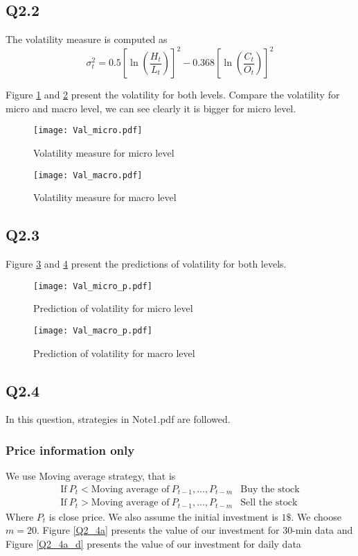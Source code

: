\documentclass[11pt]{article}
\begin{document}
\subsection{Q2.2}
The volatility measure is computed as
\[
\sigma^2_t=0.5[\ln(\frac{H_t}{L_t})]^2-0.368[\ln(\frac{C_t}{O_t})]^2
\]

Figure \ref{Val_micro} and \ref{Val_macro} present the volatility for both levels. Compare the volatility for micro and macro level, we can see clearly it is bigger for micro level.

\begin{figure}
\texttt{[image: Val\_micro.pdf]}
\caption{Volatility measure for micro level}\label{Val_micro}
\end{figure}
\begin{figure}
\texttt{[image: Val\_macro.pdf]}
\caption{Volatility measure for macro level}\label{Val_macro}
\end{figure}
\subsection{Q2.3}
Figure \ref{Val_micro_p} and \ref{Val_macro_p} present the predictions of volatility for both levels.
\begin{figure}
\texttt{[image: Val\_micro\_p.pdf]}
\caption{Prediction of volatility for micro level}\label{Val_micro_p}
\end{figure}
\begin{figure}
\texttt{[image: Val\_macro\_p.pdf]}
\caption{Prediction of volatility for macro level}\label{Val_macro_p}
\end{figure}
\subsection{Q2.4}
In this question, strategies in Note1.pdf are followed.
\subsubsection{Price information only}
We use Moving average strategy, that is
\begin{eqnarray*}
\text{If}~P_t<\text{Moving average of}~P_{t-1},\ldots,P_{t-m}&\text{Buy the stock}\\
\text{If}~P_t>\text{Moving average of}~P_{t-1},\ldots,P_{t-m}&\text{Sell the stock}
\end{eqnarray*}
Where $P_t$ is close price. We also assume the initial investment is $1\$$. We choose $m=20$. Figure \ref{Q2_4a} presents the value of our investment for 30-min data and Figure \ref{Q2_4a_d} presents the value of our investment for daily data
\end{document}
